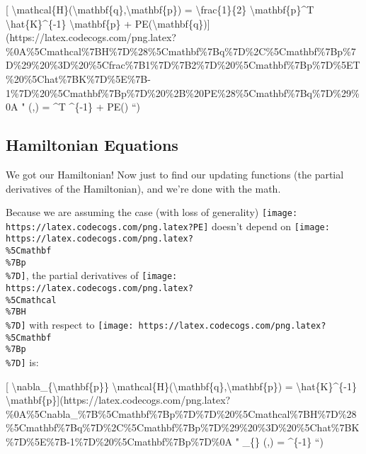 \documentclass[]{article}
\begin{document}
{[}
\textbackslash{}mathcal\{H\}(\textbackslash{}mathbf\{q\},\textbackslash{}mathbf\{p\})
= \textbackslash{}frac\{1\}\{2\} \textbackslash{}mathbf\{p\}\^{}T
\textbackslash{}hat\{K\}\^{}\{-1\} \textbackslash{}mathbf\{p\} +
PE(\textbackslash{}mathbf\{q\}){]}(https://latex.codecogs.com/png.latex?\%0A\%5Cmathcal\%7BH\%7D\%28\%5Cmathbf\%7Bq\%7D\%2C\%5Cmathbf\%7Bp\%7D\%29\%20\%3D\%20\%5Cfrac\%7B1\%7D\%7B2\%7D\%20\%5Cmathbf\%7Bp\%7D\%5ET\%20\%5Chat\%7BK\%7D\%5E\%7B-1\%7D\%20\%5Cmathbf\%7Bp\%7D\%20\%2B\%20PE\%28\%5Cmathbf\%7Bq\%7D\%29\%0A
" (,) =  \^{}T
\^{}\{-1\}  + PE() ``)

\subsection{Hamiltonian Equations}\label{hamiltonian-equations}

We got our Hamiltonian! Now just to find our updating functions (the partial
derivatives of the Hamiltonian), and we're done with the math.

Because we are assuming the case (with loss of generality)
\texttt{[image: https://latex.codecogs.com/png.latex?PE]} doesn't depend on
\texttt{[image: https://latex.codecogs.com/png.latex?\\\%5Cmathbf\\\%7Bp\\\%7D]}, the
partial derivatives of
\texttt{[image: https://latex.codecogs.com/png.latex?\\\%5Cmathcal\\\%7BH\\\%7D]} with
respect to
\texttt{[image: https://latex.codecogs.com/png.latex?\\\%5Cmathbf\\\%7Bp\\\%7D]} is:

{[} \textbackslash{}nabla\_\{\textbackslash{}mathbf\{p\}\}
\textbackslash{}mathcal\{H\}(\textbackslash{}mathbf\{q\},\textbackslash{}mathbf\{p\})
= \textbackslash{}hat\{K\}\^{}\{-1\}
\textbackslash{}mathbf\{p\}{]}(https://latex.codecogs.com/png.latex?\%0A\%5Cnabla\_\%7B\%5Cmathbf\%7Bp\%7D\%7D\%20\%5Cmathcal\%7BH\%7D\%28\%5Cmathbf\%7Bq\%7D\%2C\%5Cmathbf\%7Bp\%7D\%29\%20\%3D\%20\%5Chat\%7BK\%7D\%5E\%7B-1\%7D\%20\%5Cmathbf\%7Bp\%7D\%0A
" \nabla\_\{\} (,) = \^{}\{-1\}
 ``)
\end{document}
